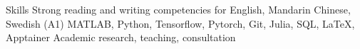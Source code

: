 
\begin{rubric}{Skills}
\entry*[Languages]
	Strong reading and writing competencies for English, Mandarin Chinese, Swedish (A1)
	MATLAB, Python, Tensorflow, Pytorch, Git, Julia, SQL, \LaTeX, Apptainer
\entry*[Misc.]
	Academic research, teaching, consultation
\end{rubric}
